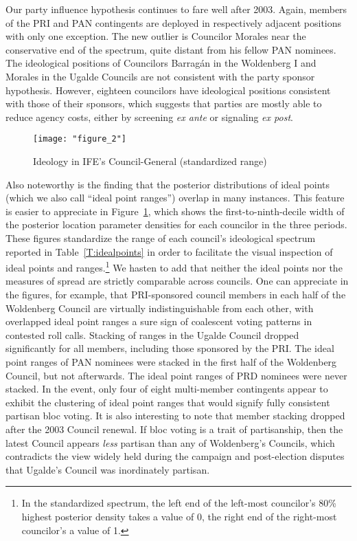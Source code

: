 \documentclass[12 pt, letter]{article}
\begin{document}
Our party influence hypothesis continues to fare well after 2003.  Again, members of the PRI and PAN contingents are deployed in respectively adjacent positions with only one exception.  The new outlier is Councilor Morales near the conservative end of the spectrum, quite distant from his fellow PAN nominees. The ideological positions of Councilors Barrag\'an in the Woldenberg I and Morales in the Ugalde Councils are not consistent with the party sponsor hypothesis. However, eighteen councilors have ideological positions consistent with those of their sponsors, which suggests that parties are mostly able to reduce agency costs, either by screening \emph{ex ante} or signaling \emph{ex post}.

\begin{figure}
\begin{center}
  \caption{Ideology in IFE's Council-General (standardized range)}\label{F:ideolbars}
  \texttt{[image: "figure\_2"]}
\end{center}
\end{figure}

Also noteworthy is the finding that the posterior distributions of ideal points (which we also call ``ideal point ranges'') overlap in many instances.  This feature is easier to appreciate in Figure~\ref{F:ideolbars}, which shows the first-to-ninth-decile width of the posterior location parameter densities for each councilor in the three periods. These figures standardize the range of each council's ideological spectrum reported in Table~\ref{T:idealpoints} in order to facilitate the visual inspection of ideal points and ranges.\footnote{In the standardized spectrum, the left end of the left-most councilor's 80\% highest posterior density takes a value of 0, the right end of the right-most councilor's a value of 1.}  We hasten to add that neither the ideal points nor the measures of spread are strictly comparable across councils.  One can appreciate in the figures, for example, that PRI-sponsored council members in each half of the Woldenberg Council are virtually indistinguishable from each other, with overlapped ideal point ranges a sure sign of coalescent voting patterns in contested roll calls. Stacking of ranges in the Ugalde Council dropped significantly for all members, including those sponsored by the PRI.  The ideal point ranges of PAN nominees were stacked in the first half of the Woldenberg Council, but not afterwards. The ideal point ranges of PRD nominees  were never stacked. In the event, only four of eight multi-member contingents appear to exhibit the clustering of ideal point ranges that would signify fully consistent partisan bloc voting.  It is also interesting to note that member stacking dropped after the 2003 Council renewal. If bloc voting is a trait of partisanship, then the latest Council appears \emph{less} partisan than any of Woldenberg's Councils, which contradicts the view widely held during the campaign and post-election disputes that Ugalde's Council was inordinately partisan.
\end{document}
